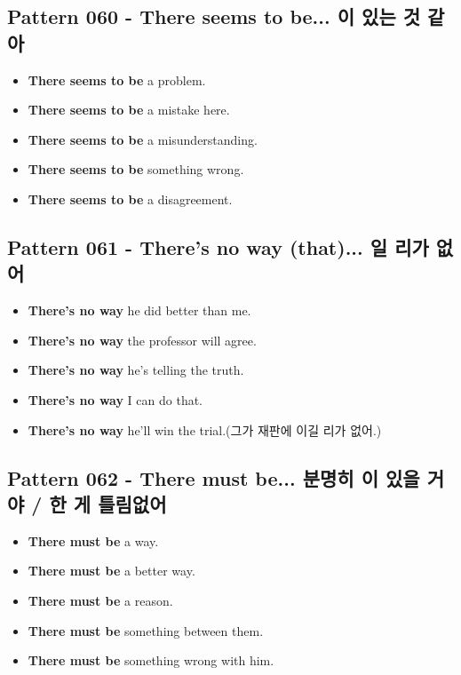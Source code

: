 \documentclass[11pt]{oblivoir}
\begin{document}
\subsection{Pattern 060 - There seems to be... \texttildelow 이 있는 것 같아}
\begin{itemize}
  \item \textbf{There seems to be} a problem.
  \item \textbf{There seems to be} a mistake here.
  \item \textbf{There seems to be} a misunderstanding.
  \item \textbf{There seems to be} something wrong.
  \item \textbf{There seems to be} a disagreement.
\end{itemize}

\subsection{Pattern 061 - There's no way (that)... \texttildelow 일 리가 없어}
\begin{itemize}
  \item \textbf{There's no way} he did better than me.
  \item \textbf{There's no way} the professor will agree.
  \item \textbf{There's no way} he's telling the truth.
  \item \textbf{There's no way} I can do that.
  \item \textbf{There's no way} he'll win the trial.(그가 재판에 이길 리가 없어.)
\end{itemize}

\subsection{Pattern 062 - There must be... 분명히 \texttildelow 이 있을 거야 / \texttildelow 한 게 틀림없어}
\begin{itemize}
  \item \textbf{There must be} a way.
  \item \textbf{There must be} a better way.
  \item \textbf{There must be} a reason.
  \item \textbf{There must be} something between them.
  \item \textbf{There must be} something wrong with him.
\end{itemize}
\end{document}

